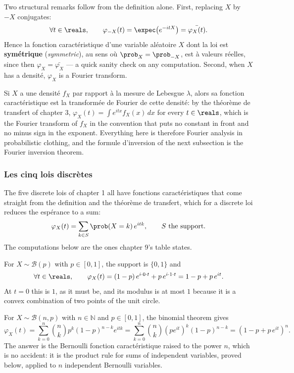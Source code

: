 Two structural remarks follow from the definition alone. First, replacing $X$ by $-X$
conjugates:
\[
  \forall t \in \reals, \qquad \varphi_{-X}(t) = \expec\!\left(e^{-itX}\right) =
  \bar{\varphi_{X}(t)}.
\]
Hence la fonction caractéristique d'une variable aléatoire $X$ dont la loi est
\textbf{symétrique} (\textit{symmetric}), au sens où $\prob_{X} = \prob_{-X}$, est à valeurs
réelles, since then $\varphi_{X} = \bar{\varphi_{X}}$ --- a quick sanity check on any
computation. Second, when $X$ has a densité, $\varphi_{X}$ is a Fourier transform.

\begin{remark}
Si $X$ a une densité $f_{X}$ par rapport à la mesure de Lebesgue $\lambda$, alors sa
fonction caractéristique est la transformée de Fourier de cette densité: by the
théorème de transfert of chapter 3,
$\varphi_{X}(t) = \int e^{itx} f_{X}(x)\,dx$ for every $t \in \reals$, which is the Fourier
transform of $f_{X}$ in the convention that puts no constant in front and no minus sign in
the exponent. Everything here is therefore Fourier analysis in probabilistic clothing, and
the formule d'inversion of the next subsection is the Fourier inversion theorem.
\end{remark}

\subsubsection{Les cinq lois discrètes}

The five discrete lois of chapter 1 all have fonctions caractéristiques that come straight
from the definition and the théorème de transfert, which for a discrete loi reduces the
espérance to a sum:
\[
  \varphi_{X}(t) = \sum_{k \in S} \prob(X = k)\, e^{itk}, \qquad S \text{ the support.}
\]
The computations below are the ones chapter 9's table states.

\begin{example}
For $X \sim \mathcal{B}(p)$ with $p \in [0,1]$, the support is $\{0,1\}$ and
\[
  \forall t \in \reals, \qquad \varphi_{X}(t) = (1-p)\,e^{i \cdot 0 \cdot t} + p\,e^{i \cdot
  1 \cdot t} = 1 - p + p\,e^{it}.
\]
At $t = 0$ this is $1$, as it must be, and its modulus is at most $1$ because it is a convex
combination of two points of the unit circle.
\end{example}

\begin{example}
For $X \sim \mathcal{B}(n,p)$ with $n \in \mathbb{N}$ and $p \in [0,1]$, the binomial
theorem gives
\[
  \varphi_{X}(t) = \sum_{k=0}^{n} \binom{n}{k} p^{k}(1-p)^{n-k} e^{itk} = \sum_{k=0}^{n}
  \binom{n}{k} \left(p e^{it}\right)^{k}(1-p)^{n-k} = \left(1 - p + p\,e^{it}\right)^{n}.
\]
The answer is the Bernoulli fonction caractéristique raised to the power $n$, which is no
accident: it is the product rule for sums of independent variables, proved below, applied to
$n$ independent Bernoulli variables.
\end{example}

